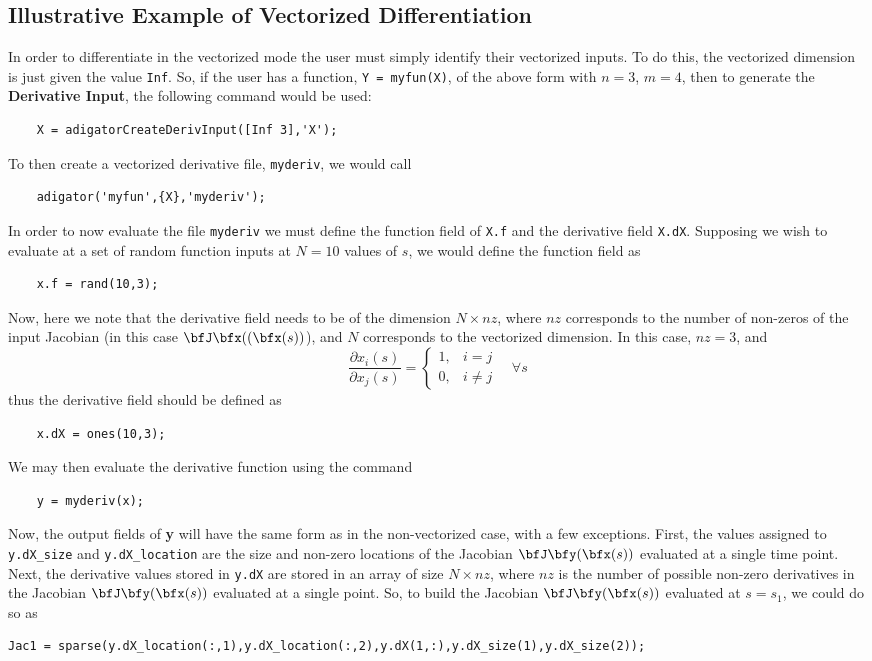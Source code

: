 \documentclass[10pt,pdftex]{article}
\begin{document}
\subsection{Illustrative Example of Vectorized Differentiation}
In order to differentiate in the vectorized mode the user must simply identify their vectorized inputs. To do this, the vectorized dimension is just given the value \texttt{Inf}. So, if the user has a function, \texttt{Y = myfun(X)}, of the above form with $n = 3$, $m = 4$, then to generate the {\bf Derivative Input}, the following command would be used:
\begin{verbatim}
    X = adigatorCreateDerivInput([Inf 3],'X');
\end{verbatim}
To then create a vectorized derivative file, \texttt{myderiv}, we would call
\begin{verbatim}
    adigator('myfun',{X},'myderiv');
\end{verbatim}
In order to now evaluate the file \texttt{myderiv} we must define the function field of \texttt{X.f} and the derivative field \texttt{X.dX}. Supposing we wish to evaluate at a set of random function inputs at $N =10$ values of $s$, we would define the function field as
\begin{verbatim}
    x.f = rand(10,3);
\end{verbatim}
Now, here we note that the derivative field needs to be of the dimension $N \times nz$, where $nz$ corresponds to the number of non-zeros of the input Jacobian (in this case $\bfJ\bfx((\bfx(s))$), and $N$ corresponds to the vectorized dimension. In this case, $nz = 3$, and
\begin{equation}
\frac{\partial x_i(s)}{\partial x_j(s)} = \left\{ \begin{array}{cl}
1, & i = j\\
0, & i \neq j
\end{array}\right.
\quad \forall s
\end{equation}
thus the derivative field should be defined as
\begin{verbatim}
    x.dX = ones(10,3);
\end{verbatim}
We may then evaluate the derivative function using the command
\begin{verbatim}
    y = myderiv(x);
\end{verbatim}
Now, the output fields of \textbf{y} will have the same form as in the non-vectorized case, with a few exceptions. First, the values assigned to \texttt{y.dX\_size}  and \texttt{y.dX\_location} are the size and non-zero locations of the Jacobian $\bfJ\bfy(\bfx(s))$ evaluated at a single time point. Next, the derivative values stored in \texttt{y.dX} are stored in an array of size $N \times nz$, where $nz$ is the number of possible non-zero derivatives in the Jacobian $\bfJ\bfy(\bfx(s))$ evaluated at a single point. So, to build the Jacobian $\bfJ\bfy(\bfx(s))$ evaluated at $s = s_1$, we could do so as
\begin{verbatim}
Jac1 = sparse(y.dX_location(:,1),y.dX_location(:,2),y.dX(1,:),y.dX_size(1),y.dX_size(2));
\end{verbatim}
\end{document}
